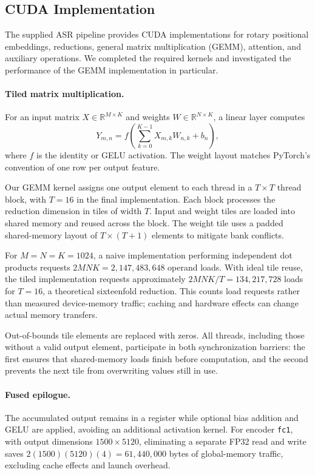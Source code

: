 \subsection{CUDA Implementation}
\label{sec:cuda_implementation}

The supplied ASR pipeline provides CUDA implementations for rotary
positional embeddings, reductions, general matrix multiplication
(GEMM), attention, and auxiliary operations. We completed the
required kernels and investigated the performance of the GEMM
implementation in particular.

\paragraph{Tiled matrix multiplication.}
For an input matrix $X\in\mathbb{R}^{M\times K}$ and weights
$W\in\mathbb{R}^{N\times K}$, a linear layer computes
\begin{equation}
Y_{m,n} =
f\left(\sum_{k=0}^{K-1}X_{m,k}W_{n,k}+b_n\right),
\end{equation}
where $f$ is the identity or GELU activation. The weight layout
matches PyTorch's convention of one row per output feature.

Our GEMM kernel assigns one output element to each thread in a
$T\times T$ thread block, with $T=16$ in the final implementation.
Each block processes the reduction dimension in tiles of width $T$.
Input and weight tiles are loaded into shared memory and reused
across the block. The weight tile uses a padded shared-memory
layout of $T\times(T+1)$ elements to mitigate bank conflicts.

For $M=N=K=1024$, a naive implementation performing independent
dot products requests $2MNK=2{,}147{,}483{,}648$ operand loads.
With ideal tile reuse, the tiled implementation requests approximately
$2MNK/T=134{,}217{,}728$ loads for $T=16$, a theoretical
sixteenfold reduction. This counts load requests rather than
measured device-memory traffic; caching and hardware effects
can change actual memory transfers.

Out-of-bounds tile elements are replaced with zeros. All threads,
including those without a valid output element, participate in
both synchronization barriers: the first ensures that shared-memory
loads finish before computation, and the second prevents the next
tile from overwriting values still in use.

\paragraph{Fused epilogue.}
The accumulated output remains in a register while optional bias
addition and GELU are applied, avoiding an additional activation
kernel. For encoder \texttt{fc1}, with output dimensions
$1500\times5120$, eliminating a separate FP32 read and write
saves $2(1500)(5120)(4)=61{,}440{,}000$ bytes of global-memory
traffic, excluding cache effects and launch overhead.


